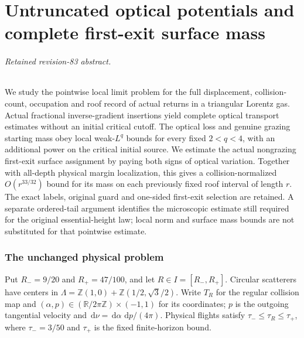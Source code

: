 \documentclass[11pt,reqno]{amsart}
\numberwithin{equation}{section}
\theoremstyle{definition}\newtheorem{definition}[theorem]{Definition}
\theoremstyle{remark}\newtheorem{remark}[theorem]{Remark}
\newcommand{\R}{\mathbb R}\newcommand{\Z}{\mathbb Z}\newcommand{\T}{\mathbb T}
\newcommand{\dd}{\,\mathrm d}\newcommand{\one}{\mathbf1}
\theoremstyle{definition}\newtheorem{inputstatement}[theorem]{Input statement}
\begin{document}
\appendix


\endgroup
\part{Untruncated optical potentials and complete first-exit surface mass}
\begingroup
\let\ArchiveLabel\label
\let\ArchiveRef\ref
\renewcommand{\label}[1]{\ArchiveLabel{v83archive:#1}}
\renewcommand{\ref}[1]{%
  \IfBeginWith{#1}{supp-}{%
    \StrBehind{#1}{supp-}[\ArchiveTarget]%
    \ArchiveRef{\ArchiveTarget}%
  }{\ArchiveRef{v83archive:#1}}%
}
\makeatletter
\let\ltx@label\label
\makeatother
\paragraph{Retained revision-83 abstract.}

We study the pointwise local limit problem for the full displacement,
collision-count, occupation and roof record of actual returns in a
triangular Lorentz gas. Actual fractional inverse-gradient insertions
yield complete optical transport estimates without an initial critical
cutoff. The optical loss and genuine grazing starting mass obey local
weak-$L^q$ bounds for every fixed $2<q<4$, with an additional power
on the critical initial source. We estimate the actual nongrazing
first-exit surface assignment by paying both signs of optical variation.
Together with all-depth physical margin localization, this gives a
collision-normalized $O(r^{33/32})$ bound for its mass on each previously
fixed roof interval of length $r$. The exact labels, original guard and
one-sided first-exit selection are retained. A separate ordered-tail
argument identifies the microscopic estimate still required for the
original essential-height law; local norm and surface mass bounds are
not substituted for that pointwise estimate.



\section{The unchanged physical problem}
Put $R_-=9/20$ and $R_+=47/100$, and let $R\in I=[R_-,R_+]$. Circular scatterers have centers in
$\Lambda=\Z(1,0)+\Z(1/2,\sqrt3/2)$. Write $T_R$ for the regular
collision map and $(\alpha,p)\in(\R/2\pi\Z)\times(-1,1)$ for its
coordinates; $p$ is the outgoing tangential velocity and
$\dd\nu=\dd\alpha\,\dd p/(4\pi)$. Physical flights satisfy
$\tau_-\le\tau_R\le\tau_+$, where $\tau_-=3/50$ and $\tau_+$
is the fixed finite-horizon bound.
\end{document}
